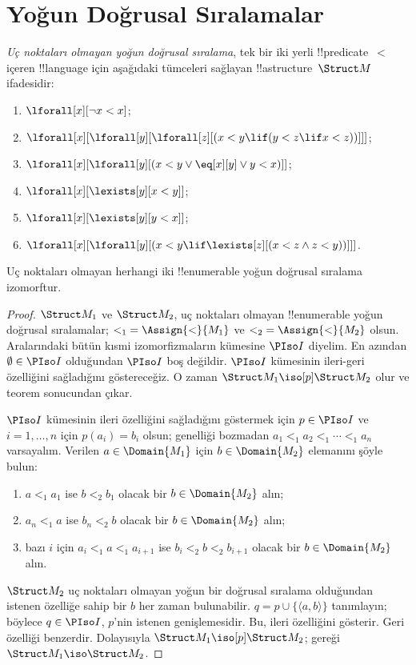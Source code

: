 \documentclass[../../../include/open-logic-section]{subfiles}
\begin{document}
\section{Yoğun Doğrusal Sıralamalar}

\begin{defn}
  \emph{Uç noktaları olmayan yoğun doğrusal sıralama}, tek bir iki yerli
  !!{predicate}~$<$ içeren !!{language} için aşağıdaki tümceleri
  sağlayan !!a{structure}~$\Struct M$ ifadesidir:
  \begin{enumerate}
  \item $\lforall[x][\lnot x < x]$;
  \item $\lforall[x][\lforall[y][\lforall[z][(x < y \lif (y < z \lif x
    <z ))]]]$;
  \item $\lforall[x][\lforall[y][(x< y \lor \eq[x][y] \lor y < x)]]$;
  \item $\lforall[x][\lexists[y][x < y]]$;
  \item $\lforall[x][\lexists[y][y < x]]$;
  \item $\lforall[x][\lforall[y][(x < y \lif \lexists[z][(x < z \land
        z < y))]]]$.
 \end{enumerate}
\end{defn}

\begin{thm}
  Uç noktaları olmayan herhangi iki !!{enumerable} yoğun doğrusal
  sıralama izomorftur.
\end{thm}

\begin{proof}
  $\Struct M_1$ ve $\Struct M_2$, uç noktaları olmayan !!{enumerable}
  yoğun doğrusal sıralamalar; ${<_1}=\Assign{<}{M_1}$ ve
  ${<_2}=\Assign{<}{M_2}$ olsun. Aralarındaki bütün kısmi
  izomorfizmaların kümesine $\PIso I$ diyelim. En azından
  $\emptyset\in\PIso I$ olduğundan $\PIso I$ boş değildir. $\PIso I$
  kümesinin ileri-geri özelliğini sağladığını göstereceğiz. O zaman
  $\Struct M_1\iso[p]\Struct M_2$ olur ve teorem
   sonucundan çıkar.

  $\PIso I$ kümesinin ileri özelliğini sağladığını göstermek için
  $p\in\PIso I$ ve $i=1,\dots,n$ için $p(a_i)=b_i$ olsun; genelliği
  bozmadan $a_1<_1a_2<_1\cdots<_1a_n$ varsayalım. Verilen
  $a\in\Domain{M_1}$ için $b\in\Domain{M_2}$ elemanını şöyle bulun:
  \begin{enumerate}
  \item $a<_1a_1$ ise $b<_2b_1$ olacak bir $b\in\Domain{M_2}$ alın;
  \item $a_n<_1a$ ise $b_n<_2b$ olacak bir $b\in\Domain{M_2}$ alın;
  \item bazı $i$ için $a_i<_1a<_1a_{i+1}$ ise
    $b_i<_2b<_2b_{i+1}$ olacak bir $b\in\Domain{M_2}$ alın.
  \end{enumerate}
  $\Struct M_2$ uç noktaları olmayan yoğun bir doğrusal sıralama
  olduğundan istenen özelliğe sahip bir $b$ her zaman bulunabilir.
  $q=p\cup\{\langle a,b\rangle\}$ tanımlayın; böylece $q\in\PIso I$,
  $p$'nin istenen genişlemesidir. Bu, ileri özelliğini gösterir. Geri
  özelliği benzerdir. Dolayısıyla $\Struct M_1\iso[p]\Struct M_2$;
   gereği $\Struct M_1\iso\Struct M_2$.
\end{proof}
\end{document}
